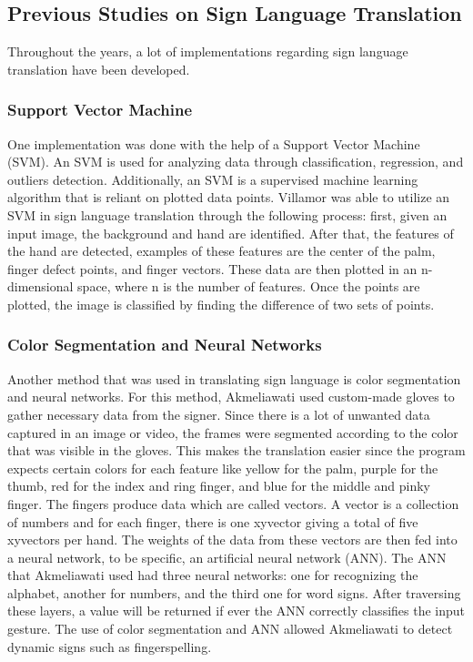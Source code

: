 \documentclass[journal]{./IEEE/IEEEtran}
\begin{document}
\subsection{Previous Studies on Sign Language Translation}
Throughout the years, a lot of implementations regarding sign language translation have been developed.
\newline
\subsubsection{Support Vector Machine}
One implementation was done with the help of a Support Vector Machine (SVM). An SVM is used for analyzing data through classification, regression, and outliers detection. Additionally, an SVM is a supervised machine learning algorithm that is reliant on plotted data points. Villamor \cite{Villamor2018} was able to utilize an SVM in sign language translation through the following process: first, given an input image, the background and hand are identified. After that, the features of the hand are detected, examples of these features are the center of the palm, finger defect points, and finger vectors. These data are then plotted in an n-dimensional space, where n is the number of features. Once the points are plotted, the image is classified by finding the difference of two sets of points.
\newline
\subsubsection{Color Segmentation and Neural Networks} 
Another method that was used in translating sign language is color segmentation and neural networks. For this method, Akmeliawati \cite{Akmeliawati2007} used custom-made gloves to gather necessary data from the signer. Since there is a lot of unwanted data captured in an image or video, the frames were segmented according to the color that was visible in the gloves. This makes the translation easier since the program expects certain colors for each feature like yellow for the palm, purple for the thumb, red for the index and ring finger, and blue for the middle and pinky finger.
\newline
\indent The fingers produce data which are called vectors. A vector is a collection of numbers and for each finger, there is one xyvector giving a total of five xyvectors per hand. The weights of the data from these vectors are then fed into a neural network, to be specific, an artificial neural network (ANN). The ANN that Akmeliawati used had three neural networks: one for recognizing the alphabet, another for numbers, and the third one for word signs. After traversing these layers, a value will be returned if ever the ANN correctly classifies the input gesture. The use of color segmentation and ANN allowed Akmeliawati to detect dynamic signs such as fingerspelling.
\newline
\end{document}

